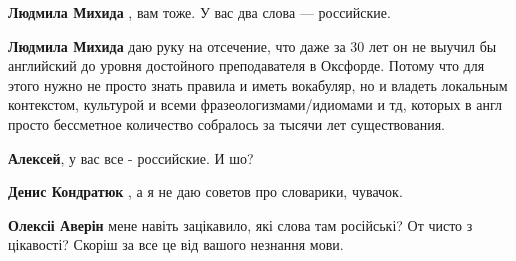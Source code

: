 \begin{itemize}
\begin{itemize}
 
\textbf{Людмила Михида} , вам тоже. У вас два слова — российские.

 
\textbf{Людмила Михида} даю руку на отсечение, что даже за 30 лет он не выучил бы английский до уровня достойного преподавателя в Оксфорде. Потому что для этого нужно не просто знать правила и иметь вокабуляр, но и владеть локальным контекстом, культурой и всеми фразеологизмами/идиомами и тд, которых в англ просто бессметное количество собралось за тысячи лет существования.

 
\textbf{Алексей}, у вас все - российские. И шо?

 
\textbf{Денис Кондратюк} , а я не даю советов про словарики, чувачок.

 
\textbf{Олексіі Аверін} мене навіть зацікавило, які слова там російські? От чисто з цікавості? Скоріш за все це від вашого незнання мови.

 

\end{itemize}
\end{itemize}
